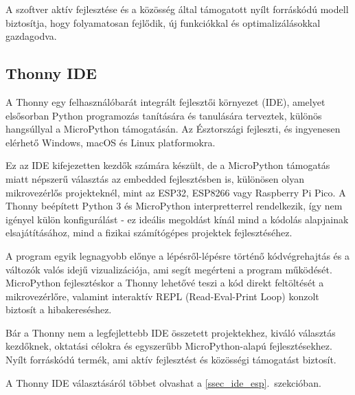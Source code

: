 \documentclass{thesis-ekf}
\theoremstyle{definition}
\theoremstyle{remark}
\begin{document}
	A szoftver aktív fejlesztése és a közösség által támogatott nyílt forráskódú modell biztosítja, hogy folyamatosan fejlődik, új funkciókkal és optimalizálásokkal gazdagodva\cite{bib_vscode}.
	\subsection{Thonny IDE}
	A Thonny egy felhasználóbarát integrált fejlesztői környezet (IDE), amelyet elsősorban Python programozás tanítására és tanulására terveztek, különös hangsúllyal a MicroPython támogatásán. Az Észtországi \href{https://ut.ee/en}{\color{blue}{Tartu Egyetem}} fejleszti, és ingyenesen elérhető Windows, macOS és Linux platformokra.
	
	Ez az IDE kifejezetten kezdők számára készült, de a MicroPython támogatás miatt népszerű választás az embedded fejlesztésben is, különösen olyan mikrovezérlős projekteknél, mint az ESP32, ESP8266 vagy Raspberry Pi Pico. A Thonny beépített Python 3 és MicroPython interpretterrel rendelkezik, így nem igényel külön konfigurálást - ez ideális megoldást kínál mind a kódolás alapjainak elsajátításához, mind a fizikai számítógépes projektek fejlesztéséhez.
	
	A program egyik legnagyobb előnye a lépésről-lépésre történő kódvégrehajtás és a változók valós idejű vizualizációja, ami segít megérteni a program működését. MicroPython fejlesztéskor a Thonny lehetővé teszi a kód direkt feltöltését a mikrovezérlőre, valamint interaktív REPL (Read-Eval-Print Loop) konzolt biztosít a hibakereséshez.
	
	Bár a Thonny nem a legfejlettebb IDE összetett projektekhez, kiváló választás kezdőknek, oktatási célokra és egyszerűbb MicroPython-alapú fejlesztésekhez. Nyílt forráskódú termék, ami aktív fejlesztést és közösségi támogatást biztosít\cite{bib_thonny,bib_thonny_deepseek}.
	
	A Thonny IDE választásáról többet olvashat a \ref{ssec_ide_esp}.~szekcióban.
\end{document}
